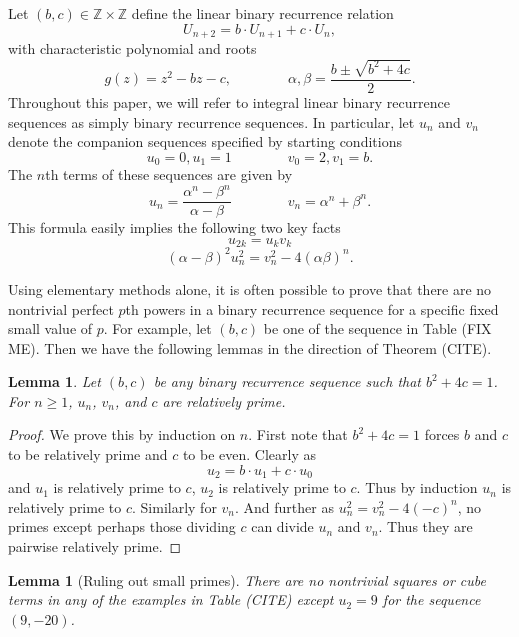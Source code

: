 \documentclass[12pt]{amsart}
\newtheorem{lem}[thm]{Lemma}
\theoremstyle{definition}
\def\Z{{\mathbb Z}}
\begin{document}
Let $(b,c) \in \Z \times \Z$ define the linear binary recurrence relation
\[ U_{n+2} = b\cdot U_{n+1}+ c\cdot U_n, \]
with characteristic polynomial and roots
\[ g(z) = z^2 - bz - c, \qquad \qquad \alpha, \beta = \frac{b \pm \sqrt{b^2+4c}}{2}.\]
Throughout this paper, we will refer to integral linear binary recurrence sequences as simply binary recurrence sequences.  In particular, let $u_n$ and $v_n$ denote the companion sequences specified by starting conditions
\[ u_0 = 0, u_1 = 1 \qquad \qquad v_0 = 2, v_1 = b .\]
The $n$th terms of these sequences are given by
\begin{equation}\label{binetform} u_n = \frac{\alpha^n - \beta^n}{\alpha - \beta} \qquad \qquad v_n = \alpha^n +\beta^n. \end{equation}
This formula easily implies the following two key facts
\begin{equation}\label{fib2} u_{2k} = u_kv_k \end{equation}
\begin{equation}\label{gen_diophan}(\alpha - \beta)^2u_n^2 = v_n^2 - 4(\alpha\beta)^n. \end{equation}

Using elementary methods alone, it is often possible to prove that there are no nontrivial perfect $p$th powers in a binary recurrence sequence for a specific fixed small value of $p$.  For example, let $(b,c)$ be one of the sequence in Table (FIX ME).  Then we have the following lemmas in the direction of Theorem (CITE).

\begin{lem}\label{relprime}
Let $(b,c)$ be any binary recurrence sequence such that $b^2+4c=1$.  For $n \geq 1$,  $u_n$, $v_n$, and $c$ are relatively prime.
\end{lem}

\begin{proof}
We prove this by induction on $n$.  First note that $b^2 +4c = 1$ forces $b$ and $c$ to be relatively prime and $c$ to be even.  Clearly as
\[ u_2 = b \cdot u_1 + c \cdot u_0 \]
and $u_1$ is relatively prime to $c$, $u_2$ is relatively prime to $c$.  Thus by induction $u_n$ is relatively prime to $c$.  Similarly for $v_n$.  And further as $u_n^2  = v_n^2 - 4(-c)^n$, no primes except perhaps those dividing $c$ can divide $u_n$ and $v_n$.  Thus they are pairwise relatively prime.
\end{proof}

\begin{lem}[Ruling out small primes]\label{smallp}
There are no nontrivial squares or cube terms in any of the examples in Table (CITE) except $u_2 = 9$ for the sequence $(9,-20)$.
\end{lem}
\end{document}
